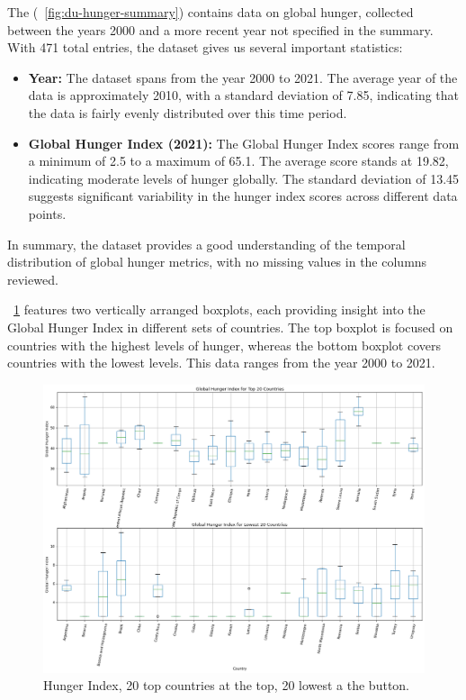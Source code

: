                The \textit{\dsHunger} (\figurename~\ref{fig:du-hunger-summary}) contains data on global hunger, collected between the years 2000 and a more recent year not specified in the summary. With 471 total entries, the dataset gives us several important statistics:

                \begin{itemize}
                        \item \textbf{Year:} The dataset spans from the year 2000 to 2021. The average year of the data is approximately 2010, with a standard deviation of 7.85, indicating that the data is fairly evenly distributed over this time period.

                        \item \textbf{Global Hunger Index (2021):} The Global Hunger Index scores range from a minimum of 2.5 to a maximum of 65.1. The average score stands at 19.82, indicating moderate levels of hunger globally. The standard deviation of 13.45 suggests significant variability in the hunger index scores across different data points.
                \end{itemize}

                In summary, the dataset provides a good understanding of the temporal distribution of global hunger metrics, with no missing values in the columns reviewed.


                \figurename~\ref{fig:du-hunger-countries-top-lw-20} features two vertically arranged boxplots, each providing insight into the Global Hunger Index in different sets of countries. The top boxplot is focused on countries with the highest levels of hunger, whereas the bottom boxplot covers countries with the lowest levels. This data ranges from the year 2000 to 2021.

                \begin{figure}[H]
                        \centering
                        \includegraphics[scale=0.4]{images/du_hunger_hu_in_cou_t_l_20}
                        \caption{Hunger Index, 20 top countries at the top, 20 lowest a the button.}
                        \label{fig:du-hunger-countries-top-lw-20}
                \end{figure}

